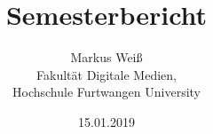 \documentclass[a4paper,12pt]{scrreprt}
\begin{document}
\setlength{\parindent}{0em}

\pagestyle{empty}

\cleardoubleoddpage

\pagestyle{fancy}



\title{Semesterbericht}
\date{15.01.2019}
\author{
Markus Weiß\\
Fakultät Digitale Medien,\\
Hochschule Furtwangen University\\
}
\maketitle

\tableofcontents















\end{document}
